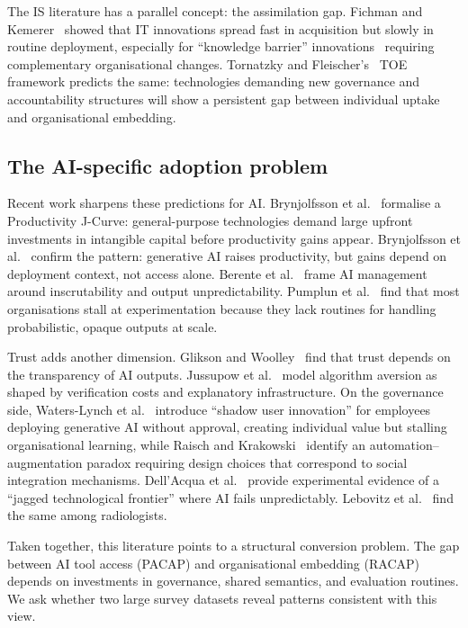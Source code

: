 \documentclass[twocolumn]{article}
\begin{document}
The IS literature has a parallel concept: the assimilation gap. Fichman and Kemerer~\cite{fichman1999illusory} showed that IT innovations spread fast in acquisition but slowly in routine deployment, especially for ``knowledge barrier'' innovations~\cite{fichman2004real} requiring complementary organisational changes. Tornatzky and Fleischer's~\cite{tornatzky1990processes} TOE framework predicts the same: technologies demanding new governance and accountability structures will show a persistent gap between individual uptake and organisational embedding.

\subsection{The AI-specific adoption problem}

Recent work sharpens these predictions for AI. Brynjolfsson et al.~\cite{brynjolfsson2021productivity} formalise a Productivity J-Curve: general-purpose technologies demand large upfront investments in intangible capital before productivity gains appear. Brynjolfsson et al.~\cite{brynjolfsson2023generative} confirm the pattern: generative AI raises productivity, but gains depend on deployment context, not access alone. Berente et al.~\cite{berente2021managing} frame AI management around inscrutability and output unpredictability. Pumplun et al.~\cite{pumplun2023organizational} find that most organisations stall at experimentation because they lack routines for handling probabilistic, opaque outputs at scale.

Trust adds another dimension. Glikson and Woolley~\cite{glikson2020human} find that trust depends on the transparency of AI outputs. Jussupow et al.~\cite{jussupow2024algorithm} model algorithm aversion as shaped by verification costs and explanatory infrastructure. On the governance side, Waters-Lynch et al.~\cite{frey2024shadow} introduce ``shadow user innovation'' for employees deploying generative AI without approval, creating individual value but stalling organisational learning, while Raisch and Krakowski~\cite{raisch2021artificial} identify an automation--augmentation paradox requiring design choices that correspond to social integration mechanisms. Dell'Acqua et al.~\cite{dellacqua2023navigating} provide experimental evidence of a ``jagged technological frontier'' where AI fails unpredictably. Lebovitz et al.~\cite{lebovitz2022maintain} find the same among radiologists.

Taken together, this literature points to a structural conversion problem. The gap between AI tool access (PACAP) and organisational embedding (RACAP) depends on investments in governance, shared semantics, and evaluation routines. We ask whether two large survey datasets reveal patterns consistent with this view.
\end{document}
